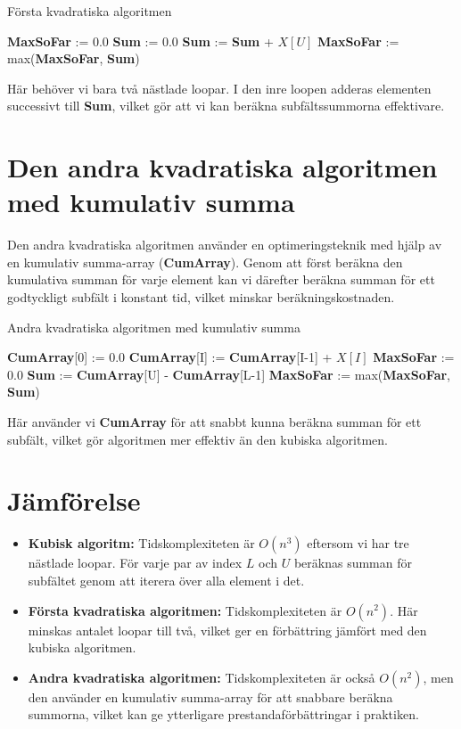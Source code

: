 \documentclass{article}
\begin{document}
\begin{algorithm}
\caption{Första kvadratiska algoritmen}
\begin{algorithmic}[1]
\State \textbf{MaxSoFar} := 0.0
    \State \textbf{Sum} := 0.0
        \State \textbf{Sum} := \textbf{Sum} + $X[U]$
        \State \textbf{MaxSoFar} := max(\textbf{MaxSoFar}, \textbf{Sum})
    \EndFor
\EndFor
\end{algorithmic}
\end{algorithm}

Här behöver vi bara två nästlade loopar. I den inre loopen adderas elementen successivt till \textbf{Sum}, vilket gör att vi kan beräkna subfältssummorna effektivare.

\section{Den andra kvadratiska algoritmen med kumulativ summa}
Den andra kvadratiska algoritmen använder en optimeringsteknik med hjälp av en kumulativ summa-array (\textbf{CumArray}). Genom att först beräkna den kumulativa summan för varje element kan vi därefter beräkna summan för ett godtyckligt subfält i konstant tid, vilket minskar beräkningskostnaden.

\begin{algorithm}
\caption{Andra kvadratiska algoritmen med kumulativ summa}
\begin{algorithmic}[1]
\State \textbf{CumArray}[0] := 0.0
    \State \textbf{CumArray}[I] := \textbf{CumArray}[I-1] + $X[I]$
\EndFor
\State \textbf{MaxSoFar} := 0.0
        \State \textbf{Sum} := \textbf{CumArray}[U] - \textbf{CumArray}[L-1]
        \State \textbf{MaxSoFar} := max(\textbf{MaxSoFar}, \textbf{Sum})
    \EndFor
\EndFor
\end{algorithmic}
\end{algorithm}

Här använder vi \textbf{CumArray} för att snabbt kunna beräkna summan för ett subfält, vilket gör algoritmen mer effektiv än den kubiska algoritmen.

\section{Jämförelse}
\begin{itemize}
    \item \textbf{Kubisk algoritm:} Tidskomplexiteten är \( O(n^3) \) eftersom vi har tre nästlade loopar. För varje par av index $L$ och $U$ beräknas summan för subfältet genom att iterera över alla element i det.
    \item \textbf{Första kvadratiska algoritmen:} Tidskomplexiteten är \( O(n^2) \). Här minskas antalet loopar till två, vilket ger en förbättring jämfört med den kubiska algoritmen.
    \item \textbf{Andra kvadratiska algoritmen:} Tidskomplexiteten är också \( O(n^2) \), men den använder en kumulativ summa-array för att snabbare beräkna summorna, vilket kan ge ytterligare prestandaförbättringar i praktiken.
\end{itemize}
\end{document}
